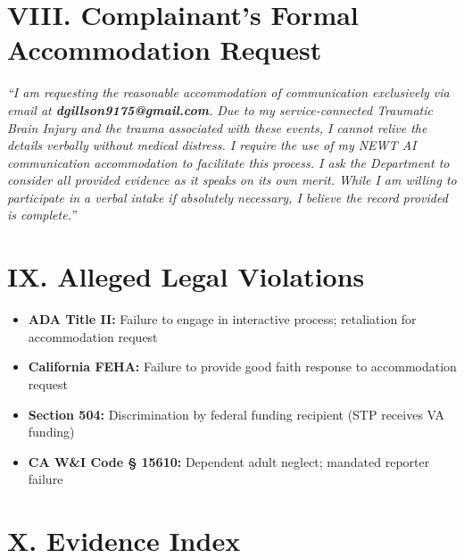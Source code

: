\documentclass[11pt, a4paper]{article}
\begin{document}
\vspace{0.5cm}

\section{VIII. Complainant's Formal Accommodation Request}

\begin{tcolorbox}[colback=white, colframe=black!50, arc=0mm]
    \textit{``I am requesting the reasonable accommodation of communication exclusively via email at \textbf{dgillson9175@gmail.com}. Due to my service-connected Traumatic Brain Injury and the trauma associated with these events, I cannot relive the details verbally without medical distress. I require the use of my NEWT AI communication accommodation to facilitate this process. I ask the Department to consider all provided evidence as it speaks on its own merit. While I am willing to participate in a verbal intake if absolutely necessary, I believe the record provided is complete.''}
\end{tcolorbox}

\vspace{0.5cm}

\section{IX. Alleged Legal Violations}

\begin{itemize}
    \item \textbf{ADA Title II:} Failure to engage in interactive process; retaliation for accommodation request
    \item \textbf{California FEHA:} Failure to provide good faith response to accommodation request
    \item \textbf{Section 504:} Discrimination by federal funding recipient (STP receives VA funding)
    \item \textbf{CA W\&I Code § 15610:} Dependent adult neglect; mandated reporter failure
\end{itemize}

\vspace{0.5cm}

\section{X. Evidence Index}
\end{document}
